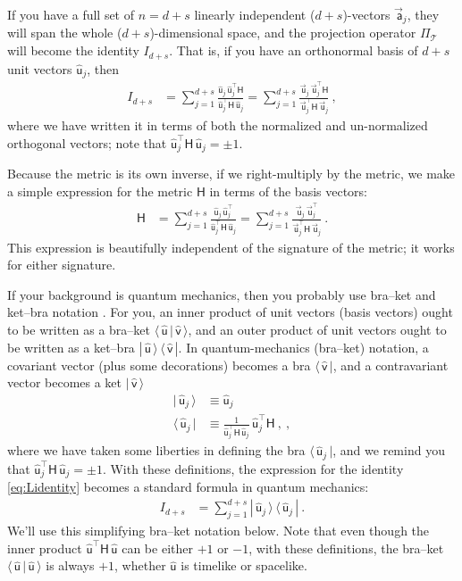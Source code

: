 \documentclass{article}
\newcommand{\metric}{\mathsf{H}}
\newcommand{\proj}{\mathsf{\Pi}}
\newcommand\upvec[1]{\!\vec{\,\mathrm{#1}}}
\newcommand{\Lvec}[1]{\upvec{\mathsf{#1}}} %
\newcommand{\Lhat}[1]{\hat{\mathsf{#1}}} %
\newcommand{\bra}[1]{\langle\,{#1}\,|}
\newcommand{\ket}[1]{|\,{#1}\,\rangle}
\newcommand{\braket}[2]{\langle\,{#1}\,|\,{#2}\,\rangle}
\newcommand{\ketbra}[2]{|\,{#1}\,\rangle\,\langle\,{#2}\,|}
\newcommand{\plus}{\!+\!} %
\begin{document}
If you have a full set of $n=d+s$ linearly independent ($d\plus s$)-vectors $\Lvec{a}_j$, they will span the whole ($d\plus s$)-dimensional space, and the projection operator $\proj_\mathscr{T}$ will become the identity $I_{d+s}$.
That is, if you have an orthonormal basis of $d+s$ unit vectors $\Lhat{u}_j$, then
\begin{align}
    I_{d+s} &= \sum_{j=1}^{d+s} \frac{\Lhat{u}_j\,\Lhat{u}_j^\top\metric}{\Lhat{u}_j^\top\metric\,\Lhat{u}_j} = \sum_{j=1}^{d+s} \frac{\Lvec{u}_j\,\Lvec{u}_j^\top\metric}{\Lvec{u}_j^\top\metric\,\Lvec{u}_j} \label{eq:Lidentity} ~,
\end{align}
where we have written it in terms of both the normalized and un-normalized orthogonal vectors; note that $\Lhat{u}_j^\top\metric\,\Lhat{u}_j=\pm 1$.

Because the metric is its own inverse, if we right-multiply by the metric, we make a simple expression for the metric $\metric$ in terms of the basis vectors:
\begin{align}
    \metric &= \sum_{j=1}^{d+s} \frac{\Lhat{u}_j\,\Lhat{u}_j^\top}{\Lhat{u}_j^\top\metric\,\Lhat{u}_j} = \sum_{j=1}^{d+s} \frac{\Lvec{u}_j\,\Lvec{u}_j^\top}{\Lvec{u}_j^\top\metric\,\Lvec{u}_j} ~.
\end{align}
This expression is beautifully independent of the signature of the metric; it works for either signature.

If your background is quantum mechanics, then you probably use bra--ket and ket--bra notation \cite{dirac}.
For you, an inner product of unit vectors (basis vectors) ought to be written as a bra--ket $\braket{\Lhat{u}}{\Lhat{v}}$, and an outer product of unit vectors ought to be written as a ket--bra $\ketbra{\Lhat{u}}{\Lhat{v}}$.
In quantum-mechanics (bra--ket) notation, a covariant vector (plus some decorations) becomes a bra $\bra{\Lhat{v}}$, and a contravariant vector becomes a ket $\ket{\Lhat{v}}$
\begin{align}
    \ket{\Lhat{u}_j} &\equiv \Lhat{u}_j \label{eq:Lket}\\
    \bra{\Lhat{u}_j} &\equiv \frac{1}{\Lhat{u}_j^\top\metric\,\Lhat{u}_j}\,\Lhat{u}_j^\top\metric ~,\label{eq:Lbra} ~,
\end{align}
where we have taken some liberties in defining the bra $\bra{\Lhat{u}_j}$, and we remind you that $\Lhat{u}_j^\top\metric\,\Lhat{u}_j=\pm 1$.
With these definitions, the expression for the identity \eqref{eq:Lidentity} becomes a standard formula in quantum mechanics:
\begin{align}
    I_{d+s} &= \sum_{j=1}^{d+s} \ketbra{\Lhat{u}_j}{\Lhat{u}_j} \label{eq:LidentityQM} ~.
\end{align}
We'll use this simplifying bra--ket notation below.
Note that even though the inner product $\Lhat{u}^\top\metric\,\Lhat{u}$ can be either $+1$ or $-1$, with these definitions, the bra--ket $\braket{\Lhat{u}}{\Lhat{u}}$ is always $+1$, whether $\Lhat{u}$ is timelike or spacelike.
\end{document}

